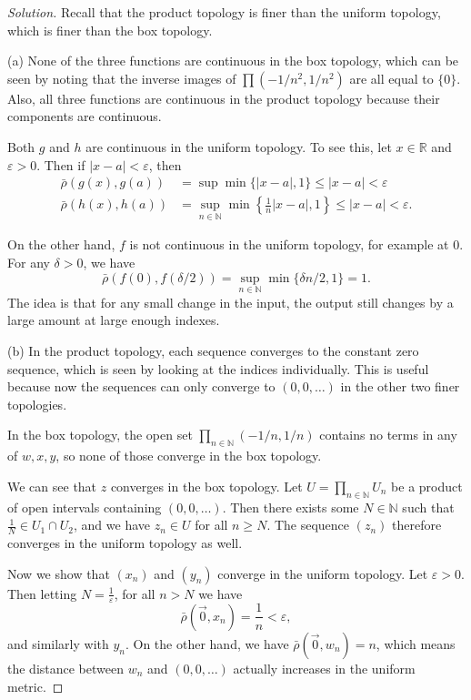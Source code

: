\documentclass{article}
\theoremstyle{definition}
\begin{document}
\begin{proof}[Solution]
  Recall that the product topology is finer than the uniform topology, which is finer than the box topology.

  (a) None of the three functions are continuous in the box topology, which can be seen by noting that the inverse images of $\prod (-1/n^2,1/n^2)$ are all equal to $\{0\}$. Also, all three functions are continuous in the product topology because their components are continuous.

  Both $g$ and $h$ are continuous in the uniform topology. To see this, let $x\in\mathbb{R}$ and $\varepsilon>0$. Then if $|x - a| < \varepsilon$, then
  \begin{align*}
    \bar{\rho}(g(x), g(a)) &= \sup \min\{|x-a|,1\} \le |x-a| < \varepsilon \\
    \bar{\rho}(h(x), h(a)) &= \sup_{n\in\mathbb{N}}\min\left\{\frac{1}{n}|x-a|,1\right\} \le |x-a| < \varepsilon.
  \end{align*}

  On the other hand, $f$ is not continuous in the uniform topology, for example at $0$. For any $\delta > 0$, we have
  $$\bar{\rho}(f(0),f(\delta/2)) = \sup_{n\in\mathbb{N}}\min\{\delta n/2, 1\} = 1.$$
  The idea is that for any small change in the input, the output still changes by a large amount at large enough indexes.

  (b) In the product topology, each sequence converges to the constant zero sequence, which is seen by looking at the indices individually. This is useful because now the sequences can only converge to $(0,0,\dots)$ in the other two finer topologies.

  In the box topology, the open set $\prod_{n\in\mathbb{N}} (-1/n,1/n)$ contains no terms in any of $w,x,y$, so none of those converge in the box topology.
  
  We can see that $z$ converges in the box topology. Let $U = \prod_{n\in\mathbb{N}}U_n$ be a product of open intervals containing $(0,0,\dots)$. Then there exists some $N\in\mathbb{N}$ such that $\frac{1}{N}\in U_1\cap U_2$, and we have $z_n\in U$ for all $n\ge N$. The sequence $(z_n)$ therefore converges in the uniform topology as well.

  Now we show that $(x_n)$ and $(y_n)$ converge in the uniform topology. Let $\varepsilon > 0$. Then letting $N = \frac{1}{\varepsilon}$, for all $n > N$ we have
  $$\bar{\rho}(\vec{0},x_{n}) = \frac{1}{n} < \varepsilon,$$
  and similarly with $y_n$. On the other hand, we have $\bar{\rho}(\vec{0},w_n) = n$, which means the distance between $w_n$ and $(0,0,\dots)$ actually increases in the uniform metric.
\end{proof}
\end{document}
